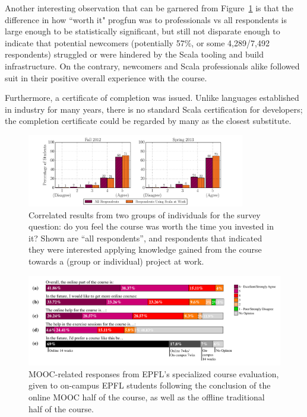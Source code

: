 \documentclass{sig-alternate}
\begin{document}
Another interesting observation that can be garnered from Figure~\ref{fig:worth-it-apply-it}
is that the difference in how ``worth it" progfun was to professionals vs all respondents
is large enough to be statistically significant, but still not disparate enough to indicate
that potential newcomers (potentially 57\%, or some 4,289/7,492 respondents) struggled or were
hindered by the Scala tooling and build infrastructure. On the contrary, newcomers and
Scala professionals alike followed suit in their positive overall experience with the course.


Furthermore, a certificate of completion was issued. Unlike languages
established in industry for many years, there is no standard Scala
certification for developers; the completion certificate could be regarded by
many as the closest substitute.


\begin{figure}[ht!]
  \centering
  \includegraphics[width=0.85\textwidth]{plots/worth-it-apply-it.pdf}
  \caption{Correlated results from two groups of individuals for the survey question: do you feel the course was worth the time you invested in it? Shown are ``all respondents'', and respondents that indicated they were interested applying knowledge gained from the course towards a (group or individual) project at work.}
  \label{fig:worth-it-apply-it}
\end{figure}

\begin{figure}[ht!]
  \centering
  \includegraphics[width=\textwidth]{plots/epfl-course-eval.pdf}
  \caption{MOOC-related responses from EPFL's specialized course evaluation, given to on-campus EPFL students following the conclusion of the online MOOC half of the course, as well as the offline traditional half of the course.}
  \label{fig:epfl-course-eval}
\end{figure}
\end{document}
